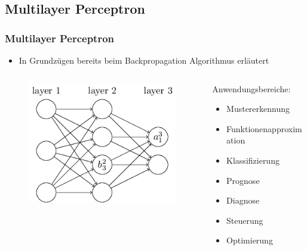 \subsection{Multilayer Perceptron}

\begin{frame}[fragile]
\frametitle{Multilayer Perceptron}

\hspace{-5mm}

\begin{itemize}
\item In Grundzügen bereits beim Backpropagation Algorithmus erläutert 
\end{itemize}

\hspace{5mm}

\begin{columns}

\begin{column}{.5\textwidth}
\begin{figure}
	\includegraphics[width=\linewidth]{./zusatz/multilayerPerceptron/img/biasAct_notation}
\end{figure}
\end{column}

\begin{column}{.5\textwidth}

Anwendungsbereiche: 
\begin{itemize}
\item Mustererkennung 
\item Funktionenapproximation
\item Klassifizierung
\item Prognose
\item Diagnose
\item Steuerung 
\item Optimierung
\end{itemize}
\end{column}


\end{columns}
\end{frame}
